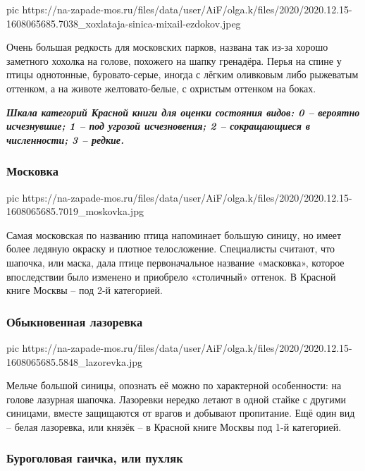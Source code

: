 \ifcmt
pic https://na-zapade-mos.ru/files/data/user/AiF/olga.k/files/2020/2020.12.15-1608065685.7038_xoxlataja-sinica-mixail-ezdokov.jpeg
\fi

Очень большая редкость для московских парков, названа так из-за хорошо
заметного хохолка на голове, похожего на шапку гренадёра. Перья на спине у
птицы однотонные, буровато-серые, иногда с лёгким оливковым либо рыжеватым
оттенком, а на животе желтовато-белые, с охристым оттенком на боках.

\begin{leftbar}
	\begingroup
		\em\bfseries\large *Шкала категорий Красной книги для оценки состояния видов: 0 – вероятно
				исчезнувшие; 1 – под угрозой исчезновения; 2 – сокращающиеся в
				численности; 3 – редкие.
	\endgroup
\end{leftbar}

\subsubsection{Московка}

\ifcmt
pic https://na-zapade-mos.ru/files/data/user/AiF/olga.k/files/2020/2020.12.15-1608065685.7019_moskovka.jpg
\fi

Самая московская по названию птица напоминает большую синицу, но имеет более
ледяную окраску и плотное телосложение. Специалисты считают, что шапочка, или
маска, дала птице первоначальное название «масковка», которое впоследствии было
изменено и приобрело «столичный» оттенок. В Красной книге Москвы – под 2-й
категорией.

\subsubsection{Обыкновенная лазоревка}

\ifcmt
pic https://na-zapade-mos.ru/files/data/user/AiF/olga.k/files/2020/2020.12.15-1608065685.5848_lazorevka.jpg
\fi

Мельче большой синицы, опознать её можно по характерной особенности: на голове
лазурная шапочка. Лазоревки нередко летают в одной стайке с другими синицами,
вместе защищаются от врагов и добывают пропитание. Ещё один вид – белая
лазоревка, или князёк – в Красной книге Москвы под 1-й категорией.

\subsubsection{Буроголовая гаичка, или пухляк}

